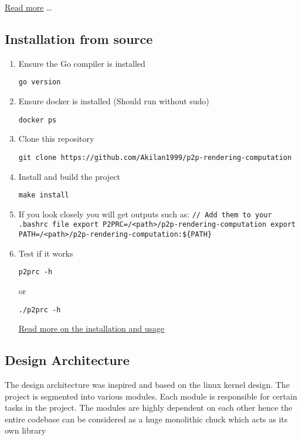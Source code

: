 \documentclass[11pt]{article}
\begin{document}
\href{Docs/Abstractions.md}{Read more} \ldots{}

\subsection{Installation from source}
\label{sec:org6f12be0}
\begin{enumerate}
\item Ensure the Go compiler is installed

\begin{verbatim}
go version
\end{verbatim}

\item Ensure docker is installed (Should run without sudo)

\begin{verbatim}
docker ps
\end{verbatim}

\item Clone this repository

\begin{verbatim}
git clone https://github.com/Akilan1999/p2p-rendering-computation
\end{verbatim}

\item Install and build the project

\begin{verbatim}
make install
\end{verbatim}

\item If you look closely you will get outputs such as:
\texttt{// Add them to your .bashrc file        export P2PRC=/<path>/p2p-rendering-computation  export PATH=/<path>/p2p-rendering-computation:\$\{PATH\}}

\setcounter{enumi}{4}
\item Test if it works

\begin{verbatim}
p2prc -h
\end{verbatim}

or

\begin{verbatim}
./p2prc -h
\end{verbatim}

\href{Docs/Installation.md}{Read more on the installation and
usage}
\end{enumerate}

\subsection{Design Architecture}
\label{sec:org2e297a7}
The design architecture was inspired and based on the linux kernel
design. The project is segmented into various modules. Each module is
responsible for certain tasks in the project. The modules are highly
dependent on each other hence the entire codebase can be considered as a
huge monolithic chuck which acts as its own library
\end{document}
